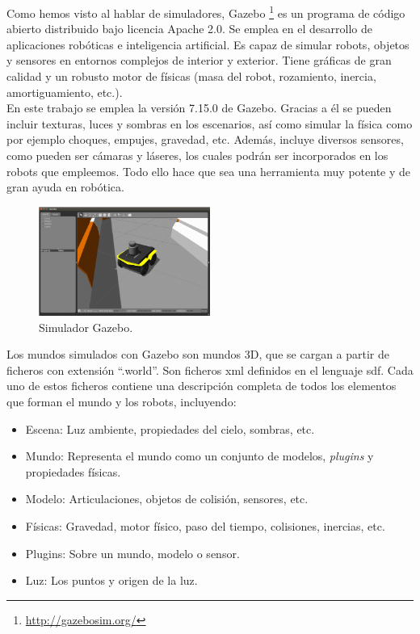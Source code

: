 Como hemos visto al hablar de simuladores, Gazebo \footnote{\url{http://gazebosim.org/}} es un programa de código abierto distribuido bajo licencia Apache 2.0. Se emplea en el desarrollo de aplicaciones robóticas e inteligencia artificial. Es capaz de simular robots, objetos y sensores en entornos complejos de interior y exterior. Tiene gráficas de gran calidad y un robusto motor de físicas (masa del robot, rozamiento, inercia, amortiguamiento, etc.).\\

En este trabajo se emplea la versión 7.15.0 de Gazebo. Gracias a él se pueden incluir texturas, luces y sombras en los escenarios, así como simular la física como por ejemplo choques, empujes, gravedad, etc. Además, incluye diversos sensores, como pueden ser cámaras y láseres, los cuales podrán ser incorporados en los robots que empleemos. Todo ello hace que sea una herramienta muy potente y de gran ayuda en robótica.\\

\begin{figure}
\begin{center}
	\includegraphics[width=0.5\textwidth]{figures/Estado_arte/gazebo2.png}
   \caption{Simulador Gazebo.}
	\label{fig.gazebo1  }
\end{center}
\end{figure}

Los mundos simulados con Gazebo son mundos 3D, que se cargan a partir de ficheros con extensión ``.world''. Son ficheros \acrfull{xml} definidos en el lenguaje \acrfull{sdf}. Cada uno de estos ficheros contiene una descripción completa de todos los elementos que forman el mundo y los robots, incluyendo:


\begin{itemize}
\item Escena: Luz ambiente, propiedades del cielo, sombras, etc.
\item Mundo: Representa el mundo como un conjunto de modelos, \textit{plugins} y propiedades físicas.
\item Modelo: Articulaciones, objetos de colisión, sensores, etc.
\item Físicas: Gravedad, motor físico, paso del tiempo, colisiones, inercias, etc.
\item Plugins: Sobre un mundo, modelo o sensor.
\item Luz: Los puntos y origen de la luz.
\end{itemize}

